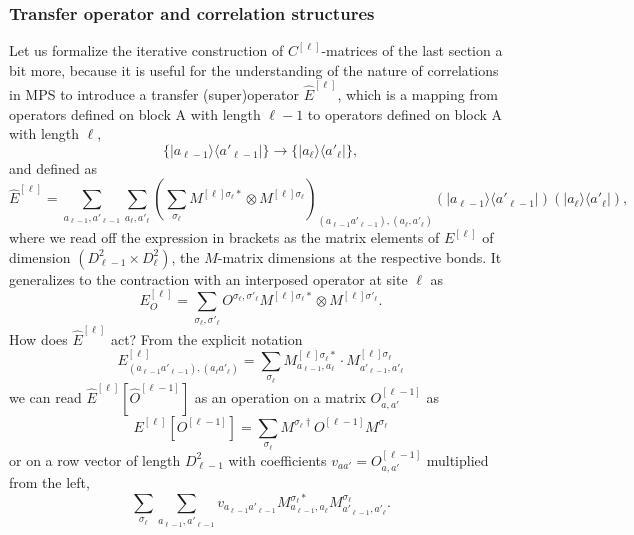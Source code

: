 \documentclass[a4paper,10pt,oneside,onecolumn,1p,times]{elsarticle}
\newcommand{\bra}[1]{\mbox{$\langle #1  |$}}
\newcommand{\ket}[1]{\mbox{$| #1  \rangle$}}
\begin{document}
\subsubsection{Transfer operator and correlation structures}
\label{subsubsec:transferoperator}
Let us formalize the iterative construction of $C^{[\ell]}$-matrices of the last section a bit more, because it is useful for the understanding of the nature of correlations in MPS to introduce a transfer (super)operator $\hat{E}^{[\ell]}$,  which is a mapping from operators defined on block A with length $\ell-1$ to operators defined on block A with length $\ell$,
\begin{equation}
\{ \ket{a_{\ell-1}} \bra{a'_{\ell-1}} \} \rightarrow \{ \ket{a_{\ell}} \bra{a'_{\ell}} \}, 
\end{equation}
and defined as
\begin{equation}
\hat{E}^{[\ell]} = \sum_{a_{\ell-1},a'_{\ell-1}} \sum_{a_\ell,a'_\ell} \left( \sum_{\sigma_\ell} M^{[\ell]\sigma_\ell *} \otimes M^{[\ell]\sigma_\ell} \right)_{(a_{\ell-1}a'_{\ell-1}),(a_\ell,a'_\ell)} (\ket{a_{\ell-1}} \bra{a'_{\ell-1}}) (\ket{a_{\ell}} \bra{a'_{\ell}}),
\end{equation}
where we read off the expression in brackets as the matrix elements of $E^{[\ell]}$ of dimension $(D^2_{\ell-1} \times D^2_{\ell})$, the $M$-matrix dimensions at the respective bonds. It generalizes to the contraction with an interposed operator at site $\ell$ as
\begin{equation}
E^{[\ell]}_O = \sum_{\sigma_\ell,\sigma'_\ell} O^{\sigma_\ell,\sigma'_\ell} M^{[\ell]\sigma_\ell *} \otimes M^{[\ell]\sigma'_\ell} .
\end{equation}
How does $\hat{E}^{[\ell]} $ act? From the explicit notation
\begin{equation}
E^{[\ell]}_{(a_{\ell-1}a'_{\ell-1}),(a_{\ell}a'_{\ell})} = \sum_{\sigma_\ell} M^{[\ell]\sigma_\ell *}_{a_{\ell-1},a_\ell} \cdot M^{[\ell]\sigma_\ell}_{a'_{\ell-1},a'_\ell}
\end{equation}
we can read $\hat{E}^{[\ell]}[ \hat{O}^{[\ell-1]}]$ as an operation on a matrix $O^{[\ell-1]}_{a,a'}$ as 
\begin{equation}
E^{[\ell]} [O^{[\ell-1]}]  = \sum_{\sigma_\ell} M^{\sigma_\ell\dagger} O^{[\ell-1]} M^{\sigma_\ell}
\end{equation} 
or on a row vector of length $D_{\ell-1}^2$ with coefficients $v_{aa'} = O^{[\ell-1]}_{a,a'}$ multiplied from the left,
\begin{equation}
\sum_{\sigma_\ell} \sum_{a_{\ell-1},a'_{\ell-1}} v_{a_{\ell-1}a'_{\ell-1}} M^{\sigma_\ell*}_{a_{\ell-1},a_\ell} M^{\sigma_\ell}_{a'_{\ell-1},a'_\ell} .
\end{equation} 
\end{document}

